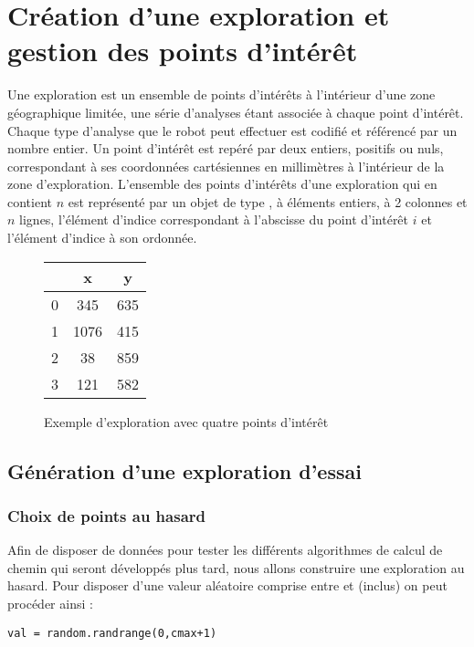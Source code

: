 \section{Création d’une exploration et gestion des points d’intérêt}
\ifprof
\else
Une exploration est un ensemble de points d’intérêts à l’intérieur d’une zone géographique limitée, une série
d’analyses étant associée à chaque point d’intérêt. Chaque type d’analyse que le robot peut effectuer est codifié
et référencé par un nombre entier. Un point d’intérêt est repéré par deux entiers, positifs ou nuls, correspondant
à ses coordonnées cartésiennes en millimètres à l’intérieur de la zone d’exploration. L’ensemble des points
d’intérêts d’une exploration qui en contient $n$ est représenté par un objet de type 
, 
à éléments
entiers, à 2 colonnes et $n$ lignes, l’élément d’indice  correspondant à l’abscisse du point d’intérêt $i$ et l’élément
d’indice  à son ordonnée.

\begin{figure}[H]
\centering
\begin{tabular} {c||cc} 

 	& x 		& y     \\ \hline 
0 	& 345 	& 635 \\ %
1 	& 1076 	& 415 \\ %
2 	& 38 		& 859 \\ %
3 	& 121 	& 582 \\ %
\end{tabular}
\caption{Exemple d’exploration avec quatre points d’intérêt \label{fig_02}}
\end{figure}
\fi
\subsection{Génération d’une exploration d’essai}
\subsubsection{Choix de points au hasard}
\ifprof
\else
Afin de disposer de données pour tester les différents algorithmes de calcul de chemin qui seront développés plus tard, nous allons construire une exploration au hasard. 
Pour disposer d'une valeur aléatoire comprise entre  et  (inclus) on peut procéder ainsi : 
\begin{lstlisting}
val = random.randrange(0,cmax+1)
\end{lstlisting}
\fi

